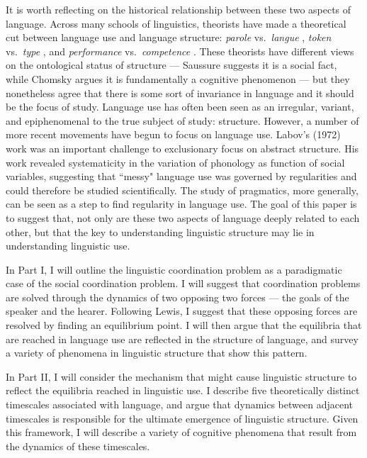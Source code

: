 \documentclass[man, noapacite, 12pt]{apa2}
\begin{document}
It is worth reflecting on the historical relationship between these two aspects of language. Across many schools of linguistics, theorists have made a theoretical cut between language use and language structure: {\it parole} vs.\  {\it langue}  \cite{saussure},  {\it token}  vs.\  {\it type}  \cite{peirce}, and  {\it performance}  vs.\  {\it competence}  \cite{chomsky1965aspects}. These theorists  have different views on the ontological status of structure --- Saussure suggests it is a social fact, while Chomsky argues it is fundamentally a cognitive phenomenon --- but they nonetheless agree that there is some sort of invariance in language and it should be the focus of study. Language use has often been seen as an irregular, variant, and epiphenomenal to the true subject of study: structure. However, a number of more recent movements have begun to focus on language use. \nocite{labov197213} Labov's (1972) work was an important challenge to exclusionary focus on abstract structure. His work revealed systematicity in the variation of phonology as function of social variables, suggesting that ``messy" language use was governed by regularities and could therefore be studied scientifically. The study of pragmatics, more generally, can be seen as a step to find regularity in language use. The goal of this paper is to suggest that, not only are these two aspects of language deeply related to each other, but that the key to understanding linguistic structure may lie in understanding linguistic use.

In Part I, I will outline the linguistic coordination problem as a paradigmatic case of the social coordination problem. I will suggest that coordination problems are solved through the dynamics of two opposing two forces --- the goals of the speaker and the hearer. Following Lewis, I suggest that these opposing forces are resolved by finding an equilibrium point. I will then argue that the equilibria that are reached in language use are reflected in the structure of language, and survey a variety of phenomena in linguistic structure that show this pattern.

In Part II, I will consider the mechanism that might cause linguistic structure to reflect the equilibria reached in linguistic use. I describe five theoretically distinct timescales associated with language, and argue that dynamics between adjacent timescales is responsible for the ultimate emergence of linguistic structure. Given this framework, I will describe a variety of cognitive phenomena that result from the dynamics of these timescales.
\end{document}
